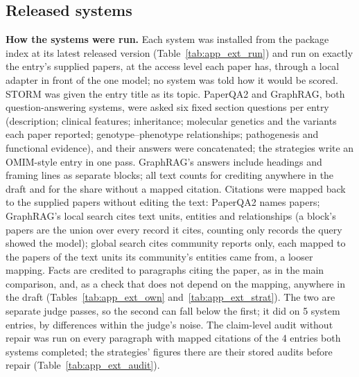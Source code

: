\documentclass{article} %
\begin{document}
\subsection{Released systems}
\label{app:r2_ext}
\textbf{How the systems were run.} Each system was installed from the package index at its latest released version (Table~\ref{tab:app_ext_run}) and run on exactly the entry's supplied papers, at the access level each paper has, through a local adapter in front of the one model; no system was told how it would be scored. STORM was given the entry title as its topic. PaperQA2 and GraphRAG, both question-answering systems, were asked six fixed section questions per entry (description; clinical features; inheritance; molecular genetics and the variants each paper reported; genotype--phenotype relationships; pathogenesis and functional evidence), and their answers were concatenated; the strategies write an OMIM-style entry in one pass. GraphRAG's answers include headings and framing lines as separate blocks; all text counts for crediting anywhere in the draft and for the share without a mapped citation. Citations were mapped back to the supplied papers without editing the text: PaperQA2 names papers; GraphRAG's local search cites text units, entities and relationships (a block's papers are the union over every record it cites, counting only records the query showed the model); global search cites community reports only, each mapped to the papers of the text units its community's entities came from, a looser mapping. Facts are credited to paragraphs citing the paper, as in the main comparison, and, as a check that does not depend on the mapping, anywhere in the draft (Tables~\ref{tab:app_ext_own} and~\ref{tab:app_ext_strat}). The two are separate judge passes, so the second can fall below the first; it did on 5 system entries, by differences within the judge's noise. The claim-level audit without repair was run on every paragraph with mapped citations of the 4 entries both systems completed; the strategies' figures there are their stored audits before repair (Table~\ref{tab:app_ext_audit}).
\end{document}
